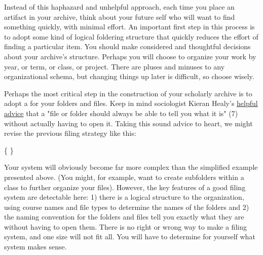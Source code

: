 Instead of this haphazard and unhelpful approach, each time you place an artifact in your archive, think about your future self who will want to find something quickly, with minimal effort. An important first step in this process is to adopt some kind of logical foldering structure that quickly reduces the effort of finding a particular item. You should make considered and thoughtful decisions about your archive's structure. Perhaps you will choose to organize your work by year, or term, or class, or project. There are pluses and minuses to any organizational schema, but changing things up later is difficult, so choose wisely. 

Perhaps the most critical step in the construction of your scholarly archive is to adopt a  for your folders and files. Keep in mind sociologist Kieran Healy's \href{https://kieranhealy.org/files/papers/plain-person-text.pdf}{helpful advice} that a "file or folder should always be able to tell you what it is" (7) without actually having to open it. Taking this sound advice to heart, we might revise the previous filing strategy like this:

\medskip

{\large
{}
}

\begin{center} \{  \} \end{center}

Your system will obviously become far more complex than the simplified example presented above. (You might, for example, want to create subfolders within a class to further organize your files). However, the key features of a good filing system are detectable here: 1) there is a logical structure to the organization, using course names and file types to determine the names of the folders and 2) the naming convention for the folders and files tell you exactly what they are without having to open them. There is no right or wrong way to make a filing system, and one size will not fit all. You will have to determine for yourself what system makes sense. 

